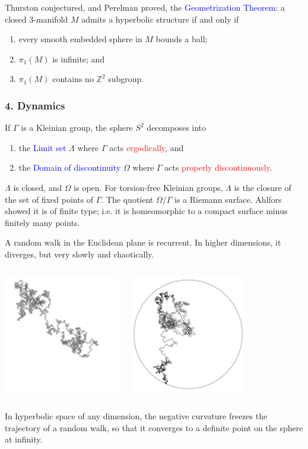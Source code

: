 \documentclass{beamer}
\def\Z{\mathbb{Z}}
\begin{document}
\frame
{
Thurston conjectured, and Perelman proved, the 
\vskip 10pt
\textcolor{blue}{Geometrization Theorem}: a closed 3-manifold $M$ admits a hyperbolic structure if and only if
\begin{enumerate}
\item{every smooth embedded sphere in $M$ bounds a ball;}
\item{$\pi_1(M)$ is infinite; and}
\item{$\pi_1(M)$ contains no $\Z^2$ subgroup.}
\end{enumerate}
}
\frame
{
\frametitle{4. Dynamics}
If $\Gamma$ is a Kleinian group, the sphere $S^2$ decomposes into 
\begin{enumerate}
\item{the \textcolor{blue}{Limit set} 
$\Lambda$ where $\Gamma$ acts \textcolor{red}{ergodically}, and}
\item{the \textcolor{blue}{Domain of discontinuity}
$\Omega$ where $\Gamma$ acts \textcolor{red}{properly discontinuously}.}
\end{enumerate}
$\Lambda$ is closed, and $\Omega$ is open. For torsion-free 
Kleinian groups, $\Lambda$ is the closure of the set of fixed points of $\Gamma$.
\vskip 10pt
The quotient $\Omega/\Gamma$ is a Riemann surface. Ahlfors showed it is of
\textcolor{dgreen}{finite type}; i.e.\/ it is homeomorphic to a compact surface
minus finitely many points.
}
\frame
{
A random walk in the Euclidean plane is recurrent. In higher dimensions, it diverges, but
very slowly and chaotically.
\begin{columns}[c]
\column{2in}
\begin{center}
\includegraphics[width=2in]{turtle_Euclid.png}
\end{center}
\column{2in}
\begin{center}
\includegraphics[width=2in]{turtle_hyperbolic.png}
\end{center}
\end{columns}
In hyperbolic space of any dimension, the negative curvature \textcolor{dgreen}{freezes} 
the trajectory of a random walk, so that it converges to a definite point on the sphere
at infinity.
}
\end{document}
